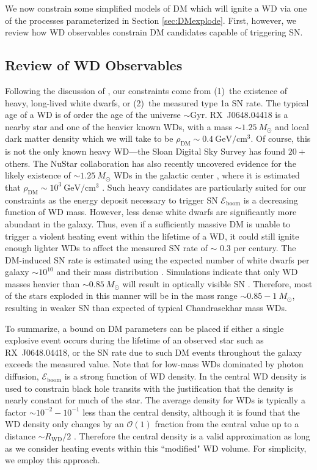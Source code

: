 \documentclass[twocolumn, preprintnumbers,amsmath,amssymb,prd, superscriptaddress]{revtex4}
\newcommand{\Eboom}{\mathcal{E}_\text{boom}}
\newcommand{\OO}{\mathcal{O}}
\newcommand{\GeV}{\text{GeV}}
\begin{document}
We now constrain some simplified models of DM which will ignite a WD via one of the processes parameterized in Section \ref{sec:DMexplode}.
First, however, we review how WD observables constrain DM candidates capable of triggering SN.

\subsection{Review of WD Observables}
Following the discussion of \cite{Graham:2015apa}, our constraints come from (1)~the existence of heavy, long-lived white dwarfs, or (2)~the measured type 1a SN rate.
The typical age of a WD is of order the age of the universe $\sim \text{Gyr}$.
RX~J0648.04418 is a nearby star and one of the heavier known WDs, with a mass $\sim 1.25 ~M_{\odot}$ \cite{Mereghetti:2013nba} and local dark matter density which we will take to be $\rho_\text{DM} \sim 0.4 ~\GeV/\text{cm}^3$.
Of course, this is not the only known heavy WD---the Sloan Digital Sky Survey \cite{SDSS} has found $20+$ others.
The NuStar collaboration has also recently uncovered evidence for the likely existence of $\sim 1.25 ~M_{\odot}$ WDs in the galactic center \cite{NuStar}, where it is estimated that $\rho_\text{DM} \sim 10^3 ~\text{GeV}/\text{cm}^3$ \cite{Nesti:2013uwa}.
Such heavy candidates are particularly suited for our constraints as the energy deposit necessary to trigger SN $\Eboom$ is a decreasing function of WD mass.
However, less dense white dwarfs are significantly more abundant in the galaxy.
Thus, even if a sufficiently massive DM is unable to trigger a violent heating event within the lifetime of a WD, it could still ignite enough lighter WDs to affect the measured SN rate of $\sim $ 0.3 per century.
The DM-induced SN rate is estimated using the expected number of white dwarfs per galaxy $\sim 10^{10}$ and their mass distribution \cite{SDSS}.
Simulations indicate that only WD masses heavier than $\sim 0.85 ~M_{\odot}$ will result in optically visible SN \cite{Graham:2015apa}.
Therefore, most of the stars exploded in this manner will be in the mass range $\sim 0.85 - 1 ~M_{\odot}$, resulting in weaker SN than expected of typical Chandrasekhar mass WDs.

To summarize, a bound on DM parameters can be placed if either a single explosive event occurs during the lifetime of an observed star such as RX~J0648.04418, or the SN rate due to such DM events throughout the galaxy exceeds the measured value.
Note that for low-mass WDs dominated by photon diffusion, $\Eboom$ is a strong function of WD density.
In \cite{Graham:2015apa} the central WD density is used to constrain black hole transits with the justification that the density is nearly constant for much of the star.
The average density for WDs is typically a factor $\sim 10^{-2} - 10^{-1}$ less than the central density, although it is found that the WD density only changes by an $\OO(1)$ fraction from the central value up to a distance $\sim R_\text{WD}/2$ \cite{Chandrasekhar}.
Therefore the central density is a valid approximation as long as we consider heating events within this ``modified" WD volume.
For simplicity, we employ this approach.
\end{document}
